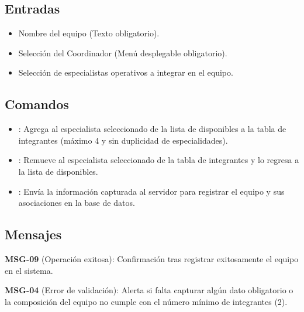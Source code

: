 \subsection{Entradas}
	\begin{itemize}
		\item Nombre del equipo (Texto obligatorio).
		\item Selección del Coordinador (Menú desplegable obligatorio).
		\item Selección de especialistas operativos a integrar en el equipo.
	\end{itemize}

\subsection{Comandos}
	\begin{itemize}
		\item \IUbutton{+}: Agrega al especialista seleccionado de la lista de disponibles a la tabla de integrantes (máximo 4 y sin duplicidad de especialidades).
		\item {}: Remueve al especialista seleccionado de la tabla de integrantes y lo regresa a la lista de disponibles.
		\item {}: Envía la información capturada al servidor para registrar el equipo y sus asociaciones en la base de datos.
	\end{itemize}

\subsection{Mensajes}
	\begin{Citemize}
		\item {\bf MSG-09} (Operación exitosa): Confirmación tras registrar exitosamente el equipo en el sistema.
		\item {\bf MSG-04} (Error de validación): Alerta si falta capturar algún dato obligatorio o la composición del equipo no cumple con el número mínimo de integrantes (2).
	\end{Citemize}
